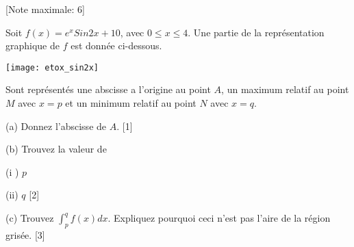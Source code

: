 \begin{question}
  \hspace*{\fill} [Note maximale: 6]\par
  \noindent Soit $f(x) = e^x Sin 2x + 10$, avec $0 \le x \le  4$.  Une partie de la représentation graphique de $f$ est donnée ci-dessous.\par
  \medskip
  \begin{center}
    \texttt{[image: etox\_sin2x]}\par
  \end{center}
  \noindent Sont représentés une abscisse a l'origine au point $A$, un maximum relatif au point $M$ avec $x = p$ et un minimum relatif au point $N$ avec $x = q$.\par
  \medskip
  (a) Donnez l'abscisse de $A$.\hspace*{\fill} [1]\par
  \medskip
  (b) Trouvez la valeur de\par
  \hspace{1em} (i ) $p$\par 
  \hspace{1em} (ii) $q$\hspace*{\fill} [2]\par
  \medskip
  (c) Trouvez $\int_p^qf(x)dx$. Expliquez pourquoi ceci n'est pas l'aire de la région grisée.\hspace*{\fill} [3]\par
\end{question}
